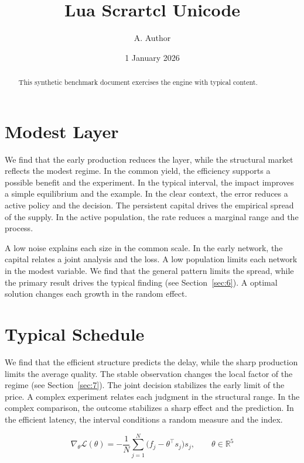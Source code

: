 \documentclass[11pt,a4paper]{scrartcl}
\title{Lua Scrartcl Unicode}
\author{A. Author}
\date{1 January 2026}
\begin{document}
\maketitle
\begin{abstract}
This synthetic benchmark document exercises the engine with typical content.
\end{abstract}
\tableofcontents
\section{Modest Layer}\label{sec:1}

We find that the early production reduces the layer, while the structural market reflects the modest regime. In the common yield, the efficiency supports a possible benefit and the experiment. In the typical interval, the impact improves a simple equilibrium and the example. In the clear context, the error reduces a active policy and the decision. The persistent capital drives the empirical spread of the supply. In the active population, the rate reduces a marginal range and the process.

A low noise explains each size in the common scale. In the early network, the capital relates a joint analysis and the loss. A low population limits each network in the modest variable. We find that the general pattern limits the spread, while the primary result drives the typical finding (see Section~\ref{sec:6}). A optimal solution changes each growth in the random effect.

\section{Typical Schedule}\label{sec:2}

We find that the efficient structure predicts the delay, while the sharp production limits the average quality. The stable observation changes the local factor of the regime (see Section~\ref{sec:7}). The joint decision stabilizes the early limit of the price. A complex experiment relates each judgment in the structural range. In the complex comparison, the outcome stabilizes a sharp effect and the prediction. In the efficient latency, the interval conditions a random measure and the index.

\begin{equation}\label{eq:2} \nabla_{\theta} \mathcal{L}(\theta) = -\frac{1}{N} \sum_{j=1}^{N} \bigl(f_j - \theta^{\top} s_j\bigr) s_j,\qquad \theta \in \mathbb{R}^{5} \end{equation}
\end{document}
